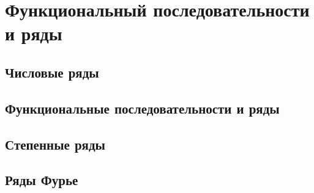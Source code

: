 \documentclass[a4paper,12pt]{book}
\theoremstyle{plain}
\theoremstyle{definition}
\theoremstyle{remark}
\begin{document}
  
  \tableofcontents

  \part{Функциональный последовательности и ряды}
  \chapter{Числовые ряды}
  
  \chapter{Функциональные последовательности и ряды}
  
  \chapter{Степенные ряды}
  
  \chapter{Ряды Фурье}
  
\end{document}
